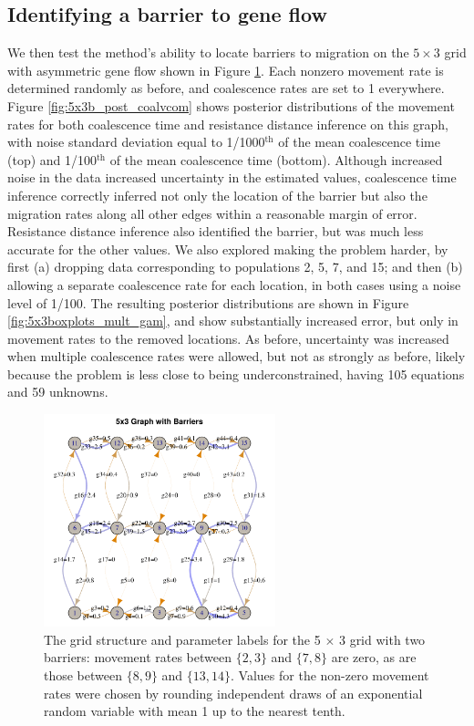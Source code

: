 \documentclass{article}
\begin{document}
\subsection*{Identifying a barrier to gene flow}
\label{sec:5x3b}


We then test the method's ability to locate barriers to migration
on the $5 \times 3$ grid with asymmetric gene flow shown in Figure \ref{fig:5x3b_grid}. 
Each nonzero movement rate is determined randomly as before,
and coalescence rates are set to 1 everywhere.
Figure \ref{fig:5x3b_post_coalvcom} shows posterior distributions of the movement rates
for both coalescence time and resistance distance inference
on this graph, with noise standard deviation equal to
1/1000${}^\text{th}$ of the mean coalescence time (top)
and 1/100${}^\text{th}$ of the mean coalescence time (bottom). 
Although increased noise in the data increased uncertainty in the estimated values,
coalescence time inference correctly inferred not only the location of the barrier
but also the migration rates along all other edges within a reasonable margin of error.
Resistance distance inference also identified the barrier,
but was much less accurate for the other values.
We also explored making the problem harder,
by first (a) dropping data corresponding to populations 2, 5, 7, and 15;
and then (b) allowing a separate coalescence rate for each location,
in both cases using a noise level of 1/100.
The resulting posterior distributions are shown in Figure \ref{fig:5x3boxplots_mult_gam},
and show substantially increased error,
but only in movement rates to the removed locations.
As before, uncertainty was increased when multiple coalescence rates were allowed,
but not as strongly as before, likely because the problem is less close to being underconstrained,
having 105 equations and 59 unknowns.


\begin{figure}
\centering
     \includegraphics[width=0.6\textwidth]{figs/5x3b_grid}
    \caption{The grid structure and parameter labels
    for the 5 $\times$ 3 grid with two barriers:
    movement rates between $\{2,3\}$ and $\{7,8\}$ are zero,
    as are those between $\{8,9\}$ and $\{13,14\}$.
    Values for the non-zero movement rates 
    were chosen by rounding independent draws of an exponential random variable with mean 1 
    up to the nearest tenth.
    } \label{fig:5x3b_grid}
\end{figure}
\end{document}
